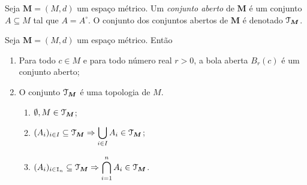 \begin{defi}
	Seja $\bm M = (M,d)$ um espaço métrico. Um \emph{conjunto aberto} de $\bm M$ é um conjunto $A \subseteq M$ tal que $A = A^\circ$. O conjunto dos conjuntos abertos de $\bm M$ é denotado $\mathcal{T}_{\bm M}$.
\end{defi}

\begin{prop}
	Seja $\bm M = (M,d)$ um espaço métrico. Então
	\begin{enumerate}
	\item Para todo $c \in M$ e para todo número real $r > 0$, a bola aberta $B_r(c)$ é um conjunto aberto;
	\item O conjunto $\mathcal{T}_{\bm M}$ é uma topologia de $M$.
		\begin{enumerate}
			\item $\emptyset,M \in \mathcal{T}_{\bm M}$;
			\item $(A_i)_{i \in I} \subseteq \mathcal{T}_{\bm M} \Rightarrow \displaystyle\bigcup_{i \in I} A_i \in \mathcal{T}_{\bm M}$;
			\item $(A_i)_{i \in \mathtt I_n} \subseteq \mathcal{T}_{\bm M} \Rightarrow \displaystyle\bigcap_{i=1}^n A_i \in \mathcal{T}_{\bm M}$.
		\end{enumerate}
	\end{enumerate}
\end{prop}
